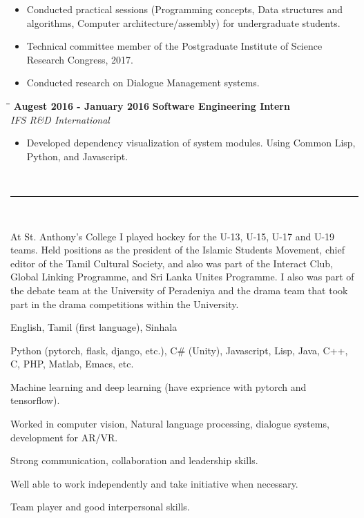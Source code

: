 \documentclass[a4paper,11pt]{article}
\begin{document}
\vspace{-8pt}
\begin{itemize}
  \setlength\itemsep{0pt}
\item Conducted practical sessions (Programming concepts, Data structures and algorithms, Computer architecture/assembly) for undergraduate students. %
\item Technical committee member of the Postgraduate Institute of Science Research Congress, 2017.
\item Conducted research on Dialogue Management systems.
\end{itemize}

\begin{tabbing}
  \=\hspace*{6cm}\=\hspace*{5cm}\= \kill
  \>\textbf{\large \textbar{}}\textbf{ Augest 2016 - January 2016} \> \textbf{Software Engineering Intern}\\\>\> \emph{IFS R\&D International}
\end{tabbing}
\vspace{-8pt}
\begin{itemize}
  \setlength\itemsep{0pt}
\item Developed dependency visualization of system modules. Using Common Lisp, Python, and Javascript.
\end{itemize}
\vspace{10pt}
\noindent\textbf{\large{}}
\vspace{-8pt}\noindent\\\rule{0.75\textwidth}{0.4pt}\\
\vspace{-8pt}
\begin{description}  
  \setlength\itemsep{0pt}
\item[Leadership Skills:] At St. Anthony’s College I played hockey for the U-13, U-15,
  U-17 and U-19 teams. Held positions as the president of the Islamic
  Students Movement, chief editor of the Tamil Cultural Society, and
  also was part of the Interact Club, Global Linking Programme, and
  Sri Lanka Unites Programme. I also was part of the debate team
  at the University of Peradeniya and the drama team that took part in
  the drama competitions within the University.
\item[Languages:] English, Tamil (first language), Sinhala
\item [Technical skills:] Python (pytorch, flask, django, etc.), C\# (Unity), Javascript, Lisp, Java, C++, C, PHP, Matlab, Emacs, etc.
\item []Machine learning and deep learning (have exprience with pytorch and tensorflow).
\item []Worked in computer vision,  Natural language processing, dialogue systems, development for AR/VR.
\item []Strong communication, collaboration and leadership skills.
\item []Well able to work independently and take initiative when necessary.
\item []Team player and good interpersonal skills.
\end{description}
\end{document}

